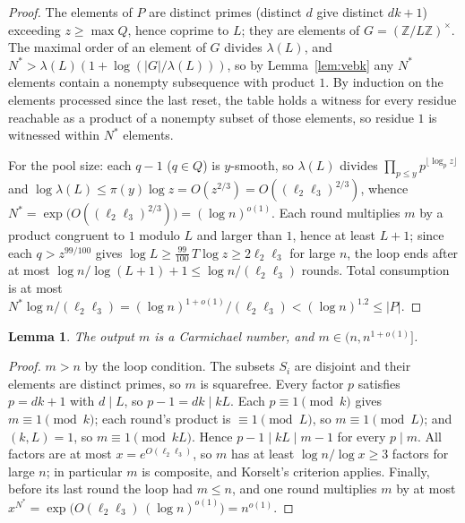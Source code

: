 \documentclass[11pt]{amsart}
\newtheorem{lemma}{Lemma}[section]
\newcommand{\Z}{\mathbb{Z}}
\begin{document}
\begin{proof}
The elements of $P$ are distinct primes (distinct $d$ give distinct
$dk+1$) exceeding $z \ge \max Q$, hence coprime to $L$; they are
elements of $G = (\Z/L\Z)^\times$. The maximal order of an element of
$G$ divides $\lambda(L)$, and
$N^* > \lambda(L)(1 + \log(|G|/\lambda(L)))$, so by
Lemma~\ref{lem:vebk} any $N^*$ elements contain a nonempty subsequence
with product $1$. By induction on the elements processed since the last
reset, the table holds a witness for every residue reachable as a
product of a nonempty subset of those elements, so residue $1$ is
witnessed within $N^*$ elements.

For the pool size: each $q - 1$ ($q \in Q$) is $y$-smooth, so
$\lambda(L)$ divides $\prod_{p \le y} p^{\lfloor \log_p z\rfloor}$ and
$\log \lambda(L) \le \pi(y)\log z = O(z^{2/3}) = O((\ell_2\ell_3)^{2/3})$,
whence $N^* = \exp\bigl(O((\ell_2\ell_3)^{2/3})\bigr) = (\log n)^{o(1)}$.
Each round multiplies $m$ by a product congruent to $1$ modulo $L$ and
larger than $1$, hence at least $L + 1$; since each $q > z^{99/100}$ gives
$\log L \ge \tfrac{99}{100}\,T\log z \ge 2\ell_2 \ell_3$ for large $n$, the
loop ends after at most $\log n / \log(L+1) + 1 \le
\log n/(\ell_2\ell_3)$ rounds. Total consumption is at most
$N^* \log n/(\ell_2 \ell_3) = (\log n)^{1+o(1)}/(\ell_2\ell_3)
< (\log n)^{1.2} \le |P|$.
\end{proof}

\begin{lemma}
The output $m$ is a Carmichael number, and $m \in (n, n^{1+o(1)}]$.
\end{lemma}

\begin{proof}
$m > n$ by the loop condition. The subsets $S_i$ are disjoint and their
elements are distinct primes, so $m$ is squarefree. Every factor $p$
satisfies $p = dk+1$ with $d \mid L$, so $p - 1 = dk \mid kL$. Each
$p \equiv 1 \pmod k$ gives $m \equiv 1 \pmod k$; each round's product is
$\equiv 1 \pmod L$, so $m \equiv 1 \pmod L$; and $(k, L) = 1$, so
$m \equiv 1 \pmod{kL}$. Hence $p - 1 \mid kL \mid m - 1$ for every
$p \mid m$. All factors are at most $x = e^{O(\ell_2\ell_3)}$, so $m$
has at least $\log n/\log x \ge 3$ factors for large $n$; in particular
$m$ is composite, and Korselt's criterion applies. Finally, before its
last round the loop had $m \le n$, and one round multiplies $m$ by at
most $x^{N^*} = \exp\bigl(O(\ell_2\ell_3)\,(\log n)^{o(1)}\bigr)
= n^{o(1)}$.
\end{proof}
\end{document}
